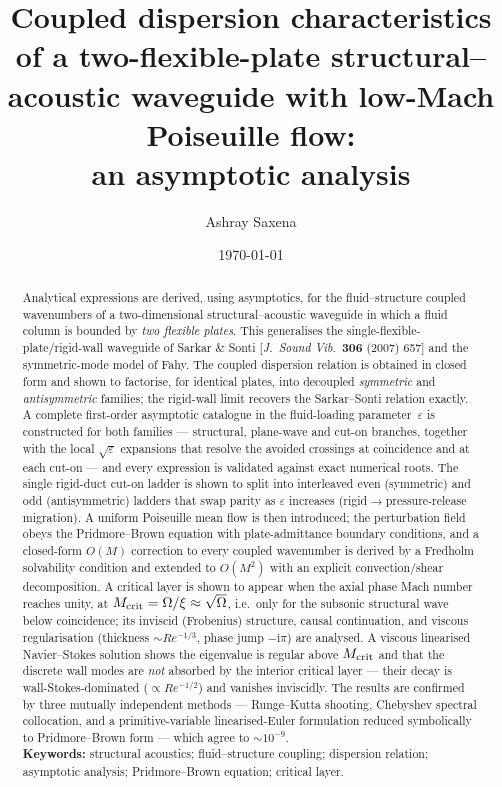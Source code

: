 \documentclass[11pt]{article}
\title{\textbf{Coupled dispersion characteristics of a two-flexible-plate
structural--acoustic waveguide with low-Mach Poiseuille flow:\\
an asymptotic analysis}}
\author[1]{Ashray Saxena}
\affil[1]{\small Department of Mechanical Engineering, Birla Institute of Technology \& Science Pilani, Pilani Campus, India}
\date{\today}
\newcommand{\Om}{\Omega}
\newcommand{\eps}{\varepsilon}
\begin{document}
\maketitle

\begin{abstract}
\noindent
Analytical expressions are derived, using asymptotics, for the fluid--structure coupled wavenumbers
of a two-dimensional structural--acoustic waveguide in which a fluid column is bounded by \emph{two
flexible plates}. This generalises the single-flexible-plate/rigid-wall waveguide of Sarkar \& Sonti
[\emph{J.\ Sound Vib.}\ \textbf{306} (2007) 657] and the symmetric-mode model of Fahy. The coupled
dispersion relation is obtained in closed form and shown to factorise, for identical plates, into
decoupled \emph{symmetric} and \emph{antisymmetric} families; the rigid-wall limit recovers the
Sarkar--Sonti relation exactly. A complete first-order asymptotic catalogue in the fluid-loading
parameter~$\eps$ is constructed for both families --- structural, plane-wave and cut-on branches,
together with the local $\sqrt{\eps}$ expansions that resolve the avoided crossings at coincidence and
at each cut-on --- and every expression is validated against exact numerical roots. The single
rigid-duct cut-on ladder is shown to split into interleaved even (symmetric) and odd (antisymmetric)
ladders that swap parity as $\eps$ increases (rigid$\to$pressure-release migration). A uniform
Poiseuille mean flow is then introduced; the perturbation field obeys the Pridmore--Brown equation
with plate-admittance boundary conditions, and a closed-form $O(M)$ correction to every coupled
wavenumber is derived by a Fredholm solvability condition and extended to $O(M^2)$ with an explicit
convection/shear decomposition. A critical layer is shown to appear when the axial phase Mach number
reaches unity, at $M_{\rm crit}=\Om/\xi\approx\sqrt{\Om}$, i.e.\ only for the subsonic structural wave
below coincidence; its inviscid (Frobenius) structure, causal continuation, and viscous regularisation
(thickness $\sim Re^{-1/3}$, phase jump $-\mathrm{i}\pi$) are analysed. A viscous linearised
Navier--Stokes solution shows the eigenvalue is regular above $M_{\rm crit}$ and that the discrete
wall modes are \emph{not} absorbed by the interior critical layer --- their decay is
wall-Stokes-dominated ($\propto Re^{-1/2}$) and vanishes inviscidly. The results are confirmed by
three mutually independent methods --- Runge--Kutta shooting, Chebyshev spectral collocation, and a
primitive-variable linearised-Euler formulation reduced symbolically to Pridmore--Brown form ---
which agree to $\sim\!10^{-9}$.
\\[1ex]
\noindent\textbf{Keywords:} structural acoustics; fluid--structure coupling; dispersion relation;
asymptotic analysis; Pridmore--Brown equation; critical layer.
\end{abstract}
\end{document}
